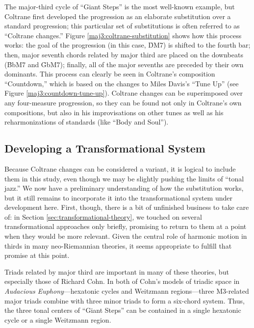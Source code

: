 The major-third cycle of ``Giant Steps'' is the most well-known example, but
Coltrane first developed the progression as an elaborate substitution over a
standard \tfo progression; this particular set of substitutions is often
referred to as ``Coltrane changes.'' Figure
\ref{maj3:coltrane-substitution} shows how this process works: the goal of the
progression (in this case, \h{DM7}) is shifted to the fourth bar; then, major
seventh chords related by major third are placed on the downbeats (\h{BbM7}
and \h{GbM7}); finally, all of the major sevenths are preceded by their own
dominants.\nocite{levine:1995} This process can clearly be seen in Coltrane's
composition ``Countdown,'' which is based on the changes to Miles Davis's
``Tune Up'' (see Figure \ref{maj3:countdown-tune-up}).
Coltrane changes can be superimposed over any four-measure \tfo progression,
so they can be found not only in Coltrane's own compositions, but also in his
improvisations on other tunes as well as his reharmonizations of standards
(like ``Body and Soul'').

\subsection{Developing a Transformational System}
\label{subsec:maj3-transformations}

Because Coltrane changes can be considered a \tf variant, it is logical to
include them in this study, even though we may be slightly pushing the limits
of ``tonal jazz.'' We now have a preliminary understanding of how the substitution
works, but it still remains to incorporate it into the transformational system
under development here. First, though, there is a bit of unfinished business
to take care of: in Section \ref{sec:transformational-theory}, we touched on
several transformational approaches only briefly, promising to return to them
at a point when they would be more relevant. Given the central role of
harmonic motion in thirds in many neo-Riemannian theories, it seems
appropriate to fulfill that promise at this point.

Triads related by major third are important in many of these theories,
but especially those of Richard Cohn. In both of Cohn's models of triadic
space in \emph{Audacious Euphony}---hexatonic cycles and Weitzmann
regions---three M3-related major triads combine with three minor triads to
form a six-chord system. Thus, the three tonal centers of ``Giant
Steps'' can be contained in a single hexatonic cycle or a single Weitzmann
region.

